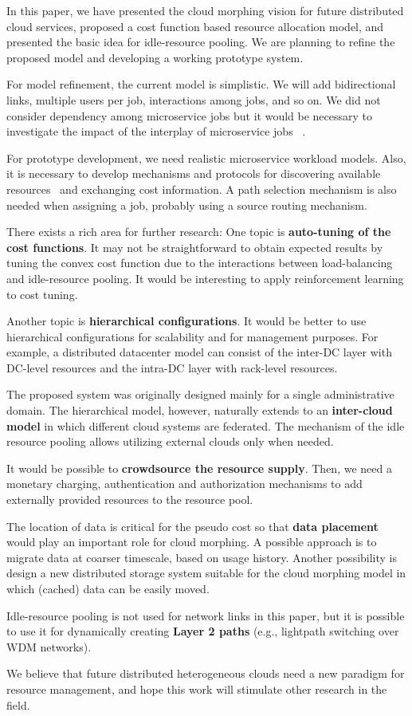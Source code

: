 
In this paper, we have presented the cloud morphing vision for
future distributed cloud services,
proposed a cost function based resource allocation model,
and presented the basic idea for idle-resource pooling.
We are planning to refine the proposed model and developing a working
prototype system.

For model refinement,
the current model is simplistic. We will add bidirectional links,
multiple users per job, interactions among jobs, and so on.
We did not consider dependency among microservice jobs but it would be
necessary to investigate the impact of the interplay of microservice
jobs ~\cite{Suresh-SOA-SOCC2017}.

For prototype development,
we need realistic microservice workload models.
Also, it is necessary to develop mechanisms and protocols for
discovering available resources~\cite{Albrecht2008} and exchanging
cost information.
A path selection mechanism is also needed when assigning a job,
probably using a source routing mechanism.

There exists a rich area for further research:
One topic is {\bf auto-tuning of the cost functions}.
It may not be straightforward to obtain expected results by tuning the
convex cost function due to the interactions between load-balancing
and idle-resource pooling.
It would be interesting to apply reinforcement learning to cost
tuning.

Another topic is {\bf hierarchical configurations}.
It would be better to use hierarchical configurations for scalability
and for management purposes.
For example, a distributed datacenter model can consist of
the inter-DC layer with DC-level resources and the intra-DC layer
with rack-level resources.

The proposed system was originally designed mainly for a single
administrative domain.
The hierarchical model, however, naturally extends to
an {\bf inter-cloud model} in which different cloud systems are
federated.
The mechanism of the idle resource pooling allows utilizing external
clouds only when needed.

It would be possible to {\bf crowdsource the resource supply}. 
Then, we need a monetary charging, authentication and authorization
mechanisms to add externally provided resources to the resource pool.

The location of data is critical for the pseudo cost so that
{\bf data placement} would play an important role for cloud morphing. 
A possible approach is to migrate data at coarser timescale, based
on usage history.
Another possibility is design a new distributed storage system
suitable for the cloud morphing model in which (cached) data can be
easily moved.

Idle-resource pooling is not used for network links in this paper, but
it is possible to use it for dynamically creating {\bf Layer 2 paths}
(e.g., lightpath switching over WDM networks).

We believe that future distributed heterogeneous clouds need a new
paradigm for resource management, and hope this work will stimulate
other research in the field.
